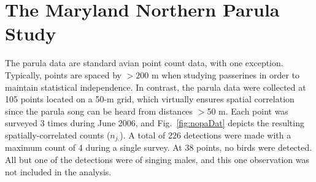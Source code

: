 \section{The Maryland Northern Parula Study}

The parula data are standard avian point count data, with one
exception. Typically, points are spaced by $>200$ m when studying
passerines in order to maintain statistical independence. In contrast,
the parula data were collected at
105 points located on a 50-m grid, which virtually ensures spatial
correlation since the parula song can be heard from distances $>$50 m.
Each point was surveyed 3 times during June 2006, and
Fig.~\ref{fig:nopaDat} depicts the resulting spatially-correlated
counts ($n_{j.}$). A total of 226 detections were made with a maximum
count of 4 during a single survey. At 38 points, no birds were
detected. All but one of the detections were of singing males, and
this one observation was not included in the analysis.

